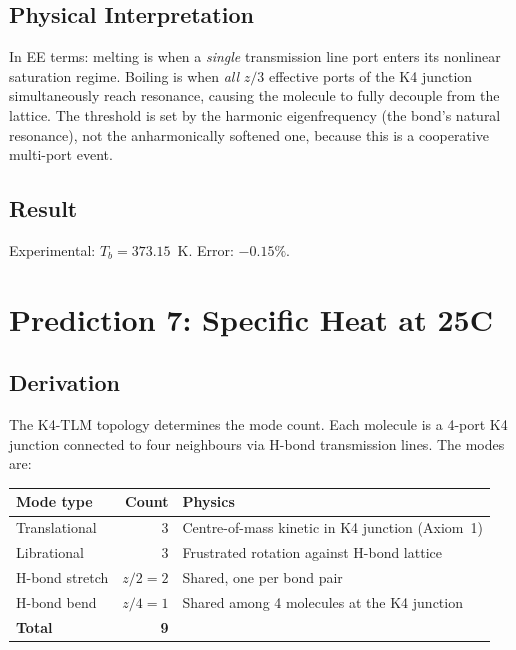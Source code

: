 \subsection{Physical Interpretation}

In EE terms: melting is when a \emph{single} transmission line port enters its nonlinear saturation regime. Boiling is when \emph{all} $z/3$ effective ports of the K4 junction simultaneously reach resonance, causing the molecule to fully decouple from the lattice. The threshold is set by the harmonic eigenfrequency (the bond's natural resonance), not the anharmonically softened one, because this is a cooperative multi-port event.

\subsection{Result}
Experimental: $T_b = 373.15$~K. \quad Error: $\mathbf{-0.15\%}$.


\section{Prediction 7: Specific Heat at 25\textdegree{}C}

\subsection{Derivation}

The K4-TLM topology determines the mode count. Each molecule is a 4-port K4 junction connected to four neighbours via H-bond transmission lines. The modes are:
\begin{center}
\renewcommand{\arraystretch}{1.3}
\begin{tabularx}{\textwidth}{@{}lrX@{}}
\toprule
\textbf{Mode type} & \textbf{Count} & \textbf{Physics} \\
\midrule
Translational        & 3     & Centre-of-mass kinetic in K4 junction (Axiom~1) \\
Librational          & 3     & Frustrated rotation against H-bond lattice \\
H-bond stretch       & $z/2 = 2$ & Shared, one per bond pair \\
H-bond bend          & $z/4 = 1$ & Shared among 4 molecules at the K4 junction \\
\midrule
\textbf{Total}       & \textbf{9} & \\
\bottomrule
\end{tabularx}
\end{center}

